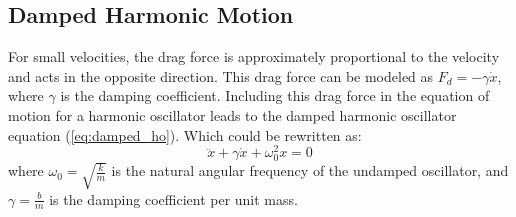 \documentclass[11pt]{report}
\begin{document}
\subsection{Damped Harmonic Motion}
\begin{definition}
    For small velocities, the drag force is approximately proportional to the velocity and acts in the opposite direction. This drag force can be modeled as \( F_d = -\gamma \dot{x} \), where \( \gamma \) is the damping coefficient. Including this drag force in the equation of motion for a harmonic oscillator leads to the damped harmonic oscillator equation (\ref{eq:damped_ho}). Which could be rewritten as:
    \begin{equation}
        \ddot{x} + \gamma \dot{x} + \omega_0^2 x = 0
    \end{equation}
    where \( \omega_0 = \sqrt{\frac{k}{m}} \) is the natural angular frequency of the undamped oscillator, and \( \gamma = \frac{b}{m} \) is the damping coefficient per unit mass.
    

\end{definition}
\end{document}
